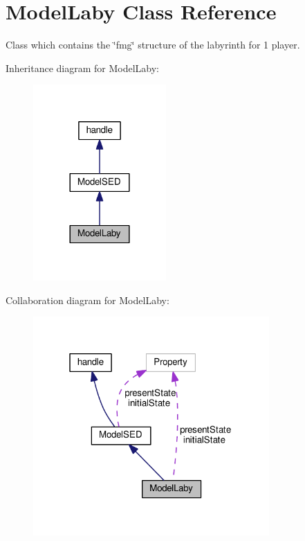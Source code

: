 \hypertarget{class_model_laby}{}\section{Model\+Laby Class Reference}
\label{class_model_laby}


Class which contains the \char`\"{}fmg\char`\"{} structure of the labyrinth for 1 player.  




Inheritance diagram for Model\+Laby\+:
\nopagebreak
\begin{figure}[H]
\begin{center}
\leavevmode
\includegraphics[width=144pt]{class_model_laby__inherit__graph}
\end{center}
\end{figure}


Collaboration diagram for Model\+Laby\+:
\nopagebreak
\begin{figure}[H]
\begin{center}
\leavevmode
\includegraphics[width=256pt]{class_model_laby__coll__graph}
\end{center}
\end{figure}
